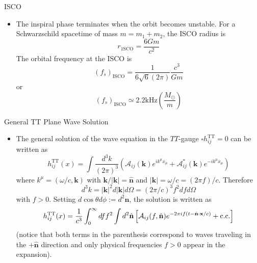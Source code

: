 \documentclass[size=11pt,style=paintings]{powerdot}
\begin{document}
\begin{slide}{ISCO}
 \begin{itemize}
 \item The inspiral phase terminates when the orbit becomes unstable. For a Schwarzschild spacetime of mass $m=m_1+m_2$, the ISCO radius is 
$$
r_{1 \mathrm{SCO}}=\frac{6 G m}{c^{2}}
$$
The orbital frequency at the ISCO is
$$
\left(f_{s}\right)_{\mathrm{ISCO}}=\frac{1}{6 \sqrt{6}(2 \pi)} \frac{c^{3}}{G m}
$$
or
$$
\boxed{\left(f_{s}\right)_{\mathrm{ISCO}} \simeq 2.2 \mathrm{kHz}\left(\frac{M_{\odot}}{m}\right)}
$$

 \end{itemize}
 \end{slide}
 \begin{slide}{General TT Plane Wave Solution}
 \begin{itemize}
 \item The general solution of the wave equation in the $TT$-gauge 
 $\square h_{i j}^{\mathrm{TT}}=0$ can be written as $$
h_{i j}^{\mathrm{TT}}(x)=\int \frac{d^{3} k}{(2 \pi)^{3}}\left(\mathcal{A}_{i j}(\mathbf{k}) e^{i k^\mu x_\mu}+\mathcal{A}_{i j}^{*}(\mathbf{k}) e^{-i k^\mu x_\mu}\right)
$$
where $ k^{\mu}=(\omega / c, \mathbf{k})$ with \(\mathbf{k} /|\mathbf{k}|=\hat{\mathbf{n}}\) and \(|\mathbf{k}|=\omega / c= (2 \pi f) / c. \) Therefore
$$
d^{3} k=|\mathbf{k}|^{2} d|\mathbf{k}| d \Omega=(2 \pi / c)^{3} f^{2} d f d \Omega
$$
with $f>0$. Setting $d \cos \theta d \phi :=d^{2} \hat{\mathbf{n}}$, the solution is written as
$$
h_{i j}^{\mathrm{TT}}(x)=\frac{1}{c^{3}} \int_{0}^{\infty} d f f^{2} \int d^{2} \hat{\mathbf{n}}\left[\mathcal{A}_{i j}(f, \hat{\mathbf{n}}) e^{-2 \pi i f(t-\hat{\mathbf{n}} \cdot \mathbf{x} / c)}+ {\rm c . c .}\right]
$$
(notice that both terms in the parenthesis correspond to waves traveling in the \(+\hat{\mathbf{n}}\) direction and only physical frequencies $f>0$ appear in the expansion).
 \end{itemize}
 \end{slide}
 
\end{document}
